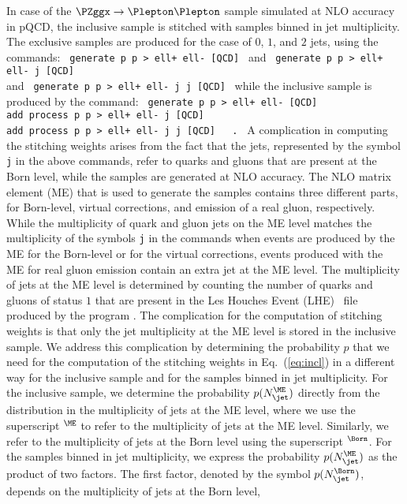 In case of the $\PZggx \to \Plepton\Plepton$ sample simulated at NLO accuracy in pQCD,
the inclusive sample is stitched with samples binned in jet multiplicity.
The exclusive samples are produced for the case of $0$, $1$, and $2$ jets, using the \MGvATNLO commands:
\texttt{
\qquad generate p p > ell+ ell- [QCD]
}
and
\texttt{
\qquad generate p p > ell+ ell- j [QCD] \\
}
and
\texttt{
\qquad generate p p > ell+ ell- j j [QCD]
}
while the inclusive sample is produced by the command:
\texttt{
\qquad generate p p > ell+ ell- [QCD] \\
\qquad add process p p > ell+ ell- j [QCD] \\
\qquad add process p p > ell+ ell- j j [QCD] \, .
}
A complication in computing the stitching weights arises from the fact that the jets, represented by the symbol \texttt{j} in the above commands,
refer to quarks and gluons that are present at the Born level, while the samples are generated at NLO accuracy.
The NLO matrix element (ME) that is used to generate the samples contains three different parts, 
for Born-level, virtual corrections, and emission of a real gluon, respectively.
While the multiplicity of quark and gluon jets on the ME level matches the multiplicity of the symbols \texttt{j} in the \MGvATNLO commands 
when events are produced by the ME for the Born-level or for the virtual corrections,
events produced with the ME for real gluon emission contain an extra jet at the ME level.
The multiplicity of jets at the ME level is determined by counting the number of quarks and gluons of status $1$ 
that are present in the \textrm{Les Houches Event} (LHE)~\cite{Alwall:2006yp} file produced by the program \MGvATNLO.
The complication for the computation of stitching weights is that only the jet multiplicity at the ME level is stored in the inclusive sample.
We address this complication by determining the probability $p$ that we need for the computation of the stitching weights in Eq.~(\ref{eq:incl})
in a different way for the inclusive sample and for the samples binned in jet multiplicity.
For the inclusive sample, we determine the probability $p(N_{\jet}^{\ME})$ directly from the distribution in the multiplicity of jets at the ME level,
where we use the superscript $^{\ME}$ to refer to the multiplicity of jets at the ME level.
Similarly, we refer to the multiplicity of jets at the Born level using the superscript $^{\Born}$.
For the samples binned in jet multiplicity,
we express the probability $p(N_{\jet}^{\ME})$ as the product of two factors.
The first factor, denoted by the symbol $p(N_{\jet}^{\Born})$, depends on the multiplicity of jets at the Born level, 
